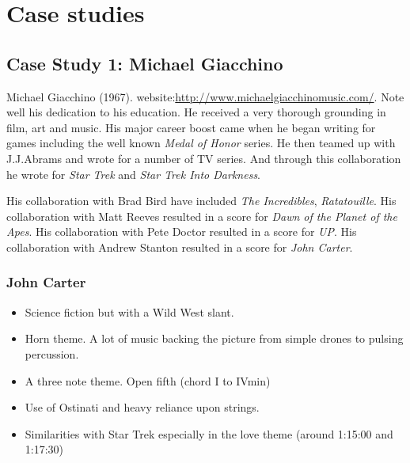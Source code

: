 
\chapter{Case studies}
\label{casestudies}

\section{Case Study 1: Michael Giacchino}

Michael Giacchino (1967). website:\url{http://www.michaelgiacchinomusic.com/}. Note well his dedication to his education. He received a very thorough grounding in film, art and music. His major career boost came when he began writing for games including the well known \textit{Medal of Honor} series. He then teamed up with J.J.Abrams and wrote for a number of TV series. And through this collaboration he wrote for \textit{Star Trek} and \textit{Star Trek Into Darkness}.

His collaboration with Brad Bird have included \textit{The Incredibles}, \textit{Ratatouille}. His collaboration with Matt Reeves resulted in a score for \textit{Dawn of the Planet of the Apes}. His collaboration with Pete Doctor resulted in a score for \textit{UP}. His collaboration with Andrew Stanton resulted in a score for \textit{John Carter}.

\subsection{John Carter}
\begin{itemize}
\item Science fiction but with a Wild West slant.   
\item Horn theme. A lot of music backing the picture from simple drones to pulsing percussion.  
\item A three note theme. Open fifth (chord I to IVmin)
\item Use of Ostinati and heavy reliance upon strings.
\item Similarities with Star Trek especially in the love theme (around 1:15:00 and 1:17:30)
\end{itemize}

